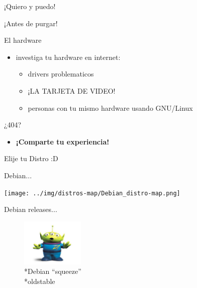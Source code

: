 \documentclass[xcolor=dvipsnames, pdf]{beamer}
\begin{document}
\begin{section}
  {¡Quiero y puedo!}
  
  \begin{subsection}
    {¡Antes de purgar!}
    \begin{frame}
      {El hardware}
      
      \begin{itemize}
      \item investiga tu hardware en internet:
        
        \begin{itemize}
        \item drivers problematicos
        \item ¡LA TARJETA DE VIDEO!
        \item personas con tu mismo hardware usando GNU/Linux
        \end{itemize}
      \end{itemize}
      ¿404?          
      \begin{itemize}
      \item \textbf{¡Comparte tu experiencia!}
      \end{itemize}
      
    \end{frame}
    
    \begin{frame}        
      \begin{center}Elije tu Distro :D\end{center}
    \end{frame}
    
    \begin{frame}
      {Debian...}            
      \begin{center} 
        \texttt{[image: ../img/distros-map/Debian\_distro-map.png]}
      \end{center}
    \end{frame}
    
    \begin{frame}
      {Debian releases...}
      
      \begin{figure}
        \includegraphics[width=3cm]{../img/debrelease/squeeze.jpg}
        \\*Debian ``squeeze'' \\*oldstable
      \end{figure}
      

\end{frame}
\end{subsection}
\end{section}
\end{document}

